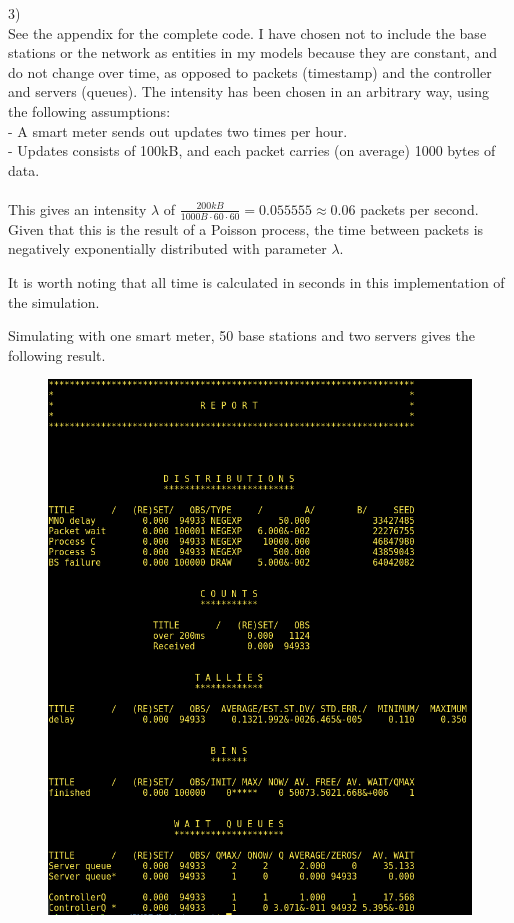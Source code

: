 \documentclass[11pt]{article}
\begin{document}
\newpage


3)\\
See the appendix for the complete code. I have chosen not to include the base stations or the network as entities in my models because they are constant, and do not change over time, as opposed to packets (timestamp) and the controller and servers (queues). The intensity has been chosen in an arbitrary way, using the following assumptions:\\
- A smart meter sends out updates two times per hour.\\
- Updates consists of 100kB, and each packet carries (on average) 1000 bytes of data.\\\\
This gives an intensity $\lambda$ of $\frac{200kB}{1000B \cdot 60 \cdot 60} = 0.055555 \approx 0.06$ packets per second.
Given that this is the result of a Poisson process, the time between packets is negatively exponentially distributed with parameter $\lambda$.

It is worth noting that all time is calculated in seconds in this implementation of the simulation.

Simulating with one smart meter, 50 base stations and two servers gives the following result.

\begin{figure}[H]
	\includegraphics[width=\textwidth]{demos_1.png}
	\centering
\end{figure}
\end{document}
